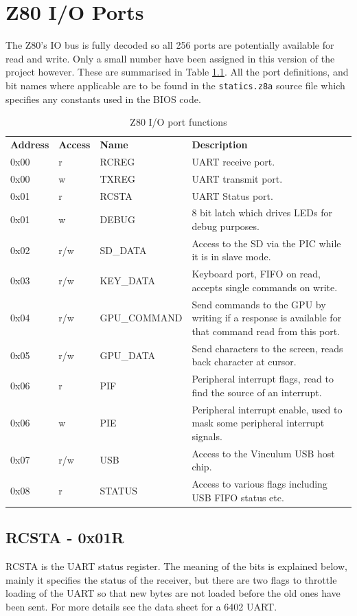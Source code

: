 \documentclass[a4paper,10pt]{book}
\begin{document}
\chapter{Z80 I/O Ports}
The Z80's IO bus is fully decoded so all 256 ports are potentially available for read and write.  Only a small number have been assigned in this version of the project however.  These are summarised in Table \ref{tab:ioports}.  All the port definitions, and bit names where applicable are to be found in the \texttt{statics.z8a} source file which specifies any constants used in the BIOS code.
\begin{table}[H]
 \begin{tabular}{lllp{4.5cm}}
  \textbf{Address}&\textbf{Access}&\textbf{Name}&\textbf{Description}\\
  0x00&r&RCREG&UART receive port.\\
  0x00&w&TXREG&UART transmit port.\\
  0x01&r&RCSTA&UART Status port.\\
  0x01&w&DEBUG&8 bit latch which drives LEDs for debug purposes.\\
  0x02&r/w&SD\_DATA&Access to the SD via the PIC while it is in slave mode.\\
  0x03&r/w&KEY\_DATA&Keyboard port, FIFO on read, accepts single commands on write.\\
  0x04&r/w&GPU\_COMMAND&Send commands to the GPU by writing if a response is available for that command read from this port.\\
  0x05&r/w&GPU\_DATA&Send characters to the screen, reads back character at cursor.\\
  0x06&r&PIF&Peripheral interrupt flags, read to find the source of an interrupt.\\
  0x06&w&PIE&Peripheral interrupt enable, used to mask some peripheral interrupt signals.\\
  0x07&r/w&USB&Access to the Vinculum USB host chip.\\
  0x08&r&STATUS&Access to various flags including USB FIFO status etc.\\
 \end{tabular}
 \caption{Z80 I/O port functions}
 \label{tab:ioports}
\end{table}


\section{RCSTA - 0x01R}
RCSTA is the UART status register.  The meaning of the bits is explained below, mainly it specifies the status of the receiver, but there are two flags to throttle loading of the UART so that new bytes are not loaded before the old ones have been sent.  For more details see the data sheet for a 6402 UART.
\vspace{12pt}
\end{document}

